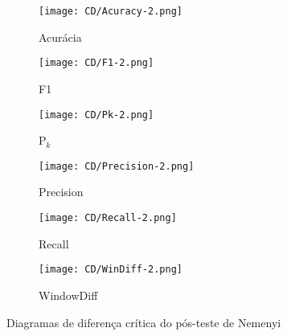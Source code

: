 \begin{figure}[!h]
	\centering
	
	\begin{subfigure}{\cdsize}	
		\centering
		\texttt{[image: CD/Acuracy-2.png]}
		\caption{Acurácia}
	\end{subfigure}
	
	\begin{subfigure}{\cdsize}	
		\centering
		\texttt{[image: CD/F1-2.png]}
		\caption{F1}
	
	\end{subfigure}

	\begin{subfigure}{\cdsize}	
		\centering
		\texttt{[image: CD/Pk-2.png]}
		\caption{P$_k$}
	
	\end{subfigure}

	\begin{subfigure}{\cdsize}	
		\centering
		\texttt{[image: CD/Precision-2.png]}
		\caption{Precision}
	
	\end{subfigure}


	\begin{subfigure}{\cdsize}	
		\centering
		\texttt{[image: CD/Recall-2.png]}
		\caption{Recall}
	
	\end{subfigure}

	\begin{subfigure}{\cdsize}	
		\centering
		\texttt{[image: CD/WinDiff-2.png]}
		\caption{WindowDiff}
	
	\end{subfigure}



	\caption{Diagramas de diferença crítica do pós-teste de Nemenyi}
	\label{fig:cd}
\end{figure}





